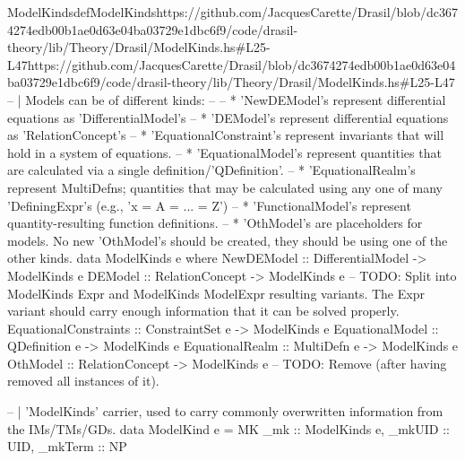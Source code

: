 \begin{haskell}{ModelKinds}{defModelKinds}{https://github.com/JacquesCarette/Drasil/blob/dc3674274edb00b1ae0d63e04ba03729e1dbc6f9/code/drasil-theory/lib/Theory/Drasil/ModelKinds.hs\#L25-L47}{https://github.com/JacquesCarette/Drasil/blob/dc3674274edb00b1ae0d63e04ba03729e1dbc6f9/code/drasil-theory/lib/Theory/Drasil/ModelKinds.hs\#L25-L47}
-- | Models can be of different kinds: 
--
--     * 'NewDEModel's represent differential equations as 'DifferentialModel's
--     * 'DEModel's represent differential equations as 'RelationConcept's
--     * 'EquationalConstraint's represent invariants that will hold in a system of equations.
--     * 'EquationalModel's represent quantities that are calculated via a single definition/'QDefinition'.
--     * 'EquationalRealm's represent MultiDefns; quantities that may be calculated using any one of many 'DefiningExpr's (e.g., 'x = A = ... = Z')
--     * 'FunctionalModel's represent quantity-resulting function definitions.
--     * 'OthModel's are placeholders for models. No new 'OthModel's should be created, they should be using one of the other kinds.
data ModelKinds e where
  NewDEModel            :: DifferentialModel -> ModelKinds e
  DEModel               :: RelationConcept   -> ModelKinds e -- TODO: Split into ModelKinds Expr and ModelKinds ModelExpr resulting variants. The Expr variant should carry enough information that it can be solved properly.
  EquationalConstraints :: ConstraintSet e   -> ModelKinds e
  EquationalModel       :: QDefinition e     -> ModelKinds e
  EquationalRealm       :: MultiDefn e       -> ModelKinds e
  OthModel              :: RelationConcept   -> ModelKinds e -- TODO: Remove (after having removed all instances of it).


-- | 'ModelKinds' carrier, used to carry commonly overwritten information from the IMs/TMs/GDs.
data ModelKind e = MK {
  _mk     :: ModelKinds e,
  _mkUID  :: UID,
  _mkTerm :: NP
}
\end{haskell}
